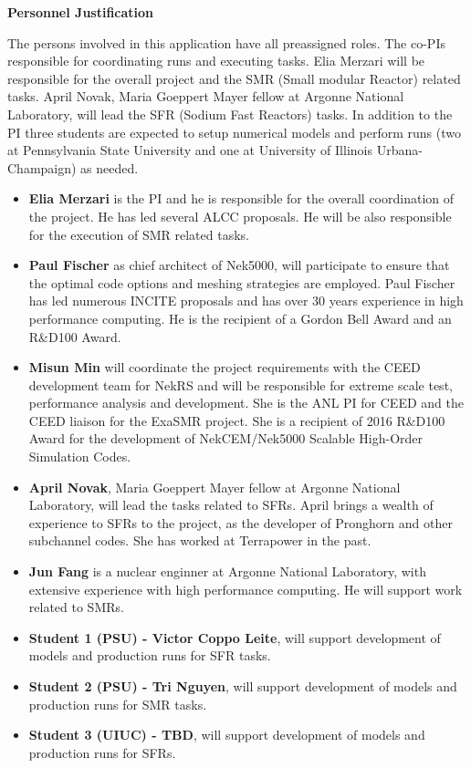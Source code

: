 \documentclass[11pt,letterpaper,english]{article}
\begin{document}
\begin{flushleft}
{\noindent \bf  {Personnel Justification}}

The persons involved in this application have all preassigned roles. The co-PIs responsible for coordinating runs and executing tasks. Elia Merzari will be responsible for the overall  project and the SMR (Small modular Reactor) related tasks. April Novak, Maria Goeppert Mayer fellow at Argonne National Laboratory, will lead the SFR (Sodium Fast Reactors) tasks. In addition to the PI three students are expected to setup numerical models and perform runs (two at Pennsylvania State University and one at University of Illinois Urbana-Champaign) as needed.

\vspace{-.15in}
\begin{itemize}
\item \textbf{Elia Merzari} is the PI and he is responsible for the overall coordination of the project. He has led several ALCC proposals. He will be also responsible for the execution of SMR related tasks.
\item \textbf{Paul Fischer} as chief architect of Nek5000, will participate to ensure that the optimal code options and meshing strategies are employed. Paul Fischer has led numerous INCITE proposals and has over 30 years experience in high performance computing. He is the recipient of a Gordon Bell Award and an R\&D100 Award.
\item \textbf{Misun Min} will coordinate the project requirements with the CEED development team for NekRS and will be responsible for extreme scale test, performance analysis and development.
She is the ANL PI for CEED and the CEED liaison for the ExaSMR project. She is a recipient of 2016 R\&D100 Award for the development of NekCEM/Nek5000 Scalable High-Order Simulation Codes.
\item \textbf{April Novak}, Maria Goeppert Mayer fellow at Argonne National Laboratory, will lead the tasks related to SFRs. April brings a wealth of experience to SFRs to the project, as the developer of Pronghorn and other subchannel codes. She has worked at Terrapower in the past.
\item \textbf{Jun Fang} is a nuclear enginner at Argonne National Laboratory, with extensive experience with high performance computing.  He will support work related to SMRs.
\item \textbf{Student 1 (PSU) - Victor Coppo Leite}, will support development of models and production runs for SFR tasks.
\item \textbf{Student 2 (PSU) - Tri Nguyen}, will support development of models and production runs for SMR tasks.
\item \textbf{Student 3 (UIUC) - TBD}, will support development of models and production runs for SFRs.
\end{itemize}


\end{flushleft}
\end{document}
